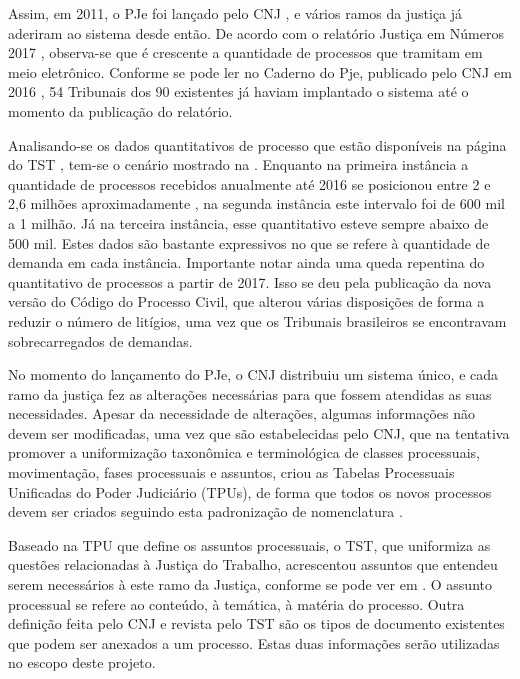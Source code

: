 Assim, em 2011, o PJe foi lançado pelo CNJ \cite{pjecnj}, e vários ramos da justiça já aderiram ao sistema desde então. De acordo com o relatório Justiça em Números 2017 \cite{justicaemnumeros2017}, observa-se que é crescente a quantidade de processos que tramitam em meio eletrônico.  Conforme se pode ler no Caderno do Pje, publicado pelo CNJ em 2016 \cite{cadernopje2016}, 54 Tribunais dos 90 existentes já haviam implantado o sistema até o momento da publicação do relatório.   

Analisando-se os dados quantitativos de processo que estão disponíveis na página do TST \cite{estatisticatsttrt}, tem-se o cenário mostrado na . Enquanto na primeira instância a quantidade de processos recebidos anualmente até 2016 se posicionou entre 2 e 2,6 milhões aproximadamente , na segunda instância este intervalo foi de 600 mil a 1 milhão. Já na terceira instância, esse quantitativo esteve sempre abaixo de 500 mil. Estes dados são bastante expressivos no que se refere à quantidade de demanda em cada instância. Importante notar ainda uma queda repentina do quantitativo de processos a partir de 2017. Isso se deu pela publicação da nova versão do Código do Processo Civil\cite{novocpc}, que alterou várias disposições de forma a reduzir o número de litígios, uma vez que os Tribunais brasileiros se encontravam sobrecarregados de demandas.


%



No momento do lançamento do PJe, o CNJ distribuiu um sistema único, e cada ramo da justiça fez as alterações necessárias para que fossem atendidas as suas necessidades. Apesar da necessidade de   alterações, algumas informações não devem ser modificadas, uma vez que são estabelecidas pelo CNJ, que na tentativa promover a uniformização taxonômica e terminológica de classes processuais, movimentação, fases processuais e assuntos, criou as  Tabelas Processuais Unificadas do Poder Judiciário (TPUs), de forma que todos os novos processos devem ser criados seguindo esta padronização de nomenclatura \cite{tpucnj}.

Baseado na TPU que define os assuntos processuais, o TST, que uniformiza as questões relacionadas à Justiça do Trabalho, acrescentou assuntos que entendeu serem necessários à este ramo da Justiça, conforme se pode ver em \cite{tputst}. O assunto processual se refere ao conteúdo, à temática, à matéria do processo. Outra definição feita pelo CNJ e revista pelo TST são os tipos de documento existentes que podem ser anexados a um processo. Estas duas informações serão utilizadas no escopo deste projeto. 

